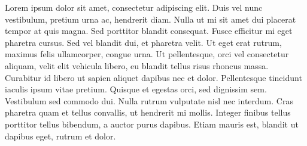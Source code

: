 

\pagestyle{empty}
\sphinxmaketitle
\pagestyle{plain}
\sphinxtableofcontents
\pagestyle{normal}
\label{\detokenize{intro::doc}}


\sphinxAtStartPar
Lorem ipsum dolor sit amet, consectetur adipiscing elit. Duis vel nunc vestibulum, pretium urna ac, hendrerit diam. Nulla ut mi sit amet dui placerat tempor at quis magna. Sed porttitor blandit consequat. Fusce efficitur mi eget pharetra cursus. Sed vel blandit dui, et pharetra velit. Ut eget erat rutrum, maximus felis ullamcorper, congue urna. Ut pellentesque, orci vel consectetur aliquam, velit elit vehicula libero, eu blandit tellus risus rhoncus massa. Curabitur id libero ut sapien aliquet dapibus nec et dolor. Pellentesque tincidunt iaculis ipsum vitae pretium. Quisque et egestas orci, sed dignissim sem. Vestibulum sed commodo dui. Nulla rutrum vulputate nisl nec interdum. Cras pharetra quam et tellus convallis, ut hendrerit mi mollis. Integer finibus tellus porttitor tellus bibendum, a auctor purus dapibus. Etiam mauris est, blandit ut dapibus eget, rutrum et dolor.

\begin{DUlineblock}{0em}
\item[] 
\end{DUlineblock}


